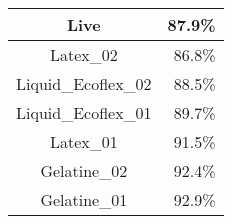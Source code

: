 \begin{tabular}{ c   r }
    Live                & 87.9\% \\ \hline\hline
    Latex\_02           & 86.8\% \\    
    Liquid\_Ecoflex\_02 & 88.5\% \\
    Liquid\_Ecoflex\_01 & 89.7\% \\
    Latex\_01           & 91.5\% \\
    Gelatine\_02        & 92.4\% \\
    Gelatine\_01        & 92.9\% \\
\end{tabular}
